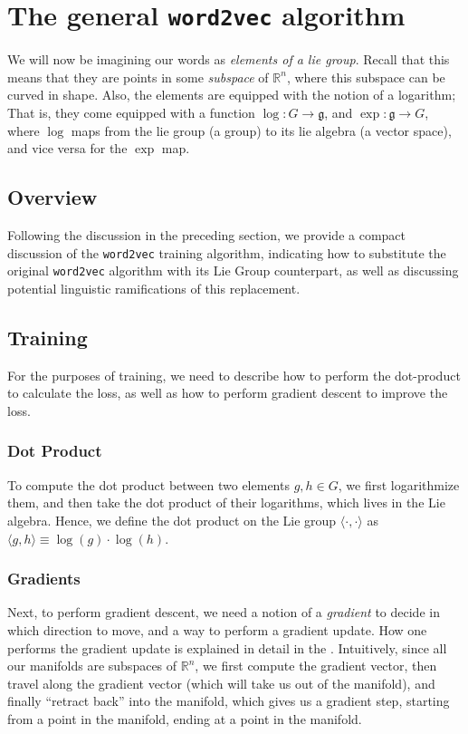 \documentclass[11pt]{book}
\begin{document}

\section{The general \texttt{word2vec} algorithm}
We will now be imagining our words as \emph{elements of a lie group}. Recall that this means that
they are points in some \emph{subspace} of $\mathbb R^n$, where this subspace can be curved in shape.
Also, the elements are equipped with the notion of a logarithm; That is, they come equipped with a
function $\log : G \rightarrow \mathfrak g$, and $\exp: \mathfrak g \rightarrow G$,
where $\log$ maps from the lie group (a group) to its lie algebra (a vector space),
and vice versa for the $\exp$ map.


\subsection{Overview}

Following the discussion in the preceding section, we provide a compact discussion of the \texttt{word2vec}
training algorithm, indicating how to substitute the original \texttt{word2vec} algorithm with
its Lie Group counterpart, as well as discussing potential linguistic ramifications of this replacement.

\subsection{Training}

For the purposes of training, we need to describe how to perform the dot-product to calculate the loss,
as well as how to perform gradient descent to improve the loss. 

\subsubsection{Dot Product}  To compute the dot product between two elements $g, h \in G$, we first logarithmize
them, and then take the dot product of their logarithms, which lives in the Lie algebra.
Hence, we define the dot product on the Lie group $\langle \cdot , \cdot \rangle$ as
$\langle g, h \rangle \equiv \log(g) \cdot \log(h)$.


\subsubsection{Gradients} Next, to perform gradient descent, we need
a notion of a \emph{gradient} to decide in which direction to move, and a way to perform a gradient update.
How one performs the gradient update is explained in detail in the \label{section:optim-on-riem}. Intuitively,
since all our manifolds are subspaces of $\mathbb R^n$, we first compute the gradient vector, then travel
along the gradient vector (which will take us out of the manifold), and finally ``retract back'' into the
manifold, which gives us a gradient step, starting from a point in the manifold, ending at a point in the manifold.
\end{document}
